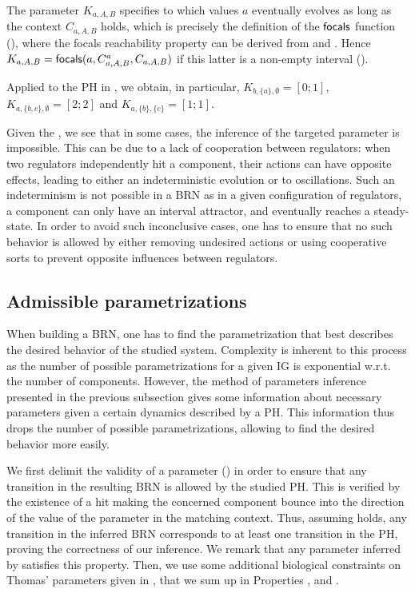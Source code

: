 The parameter $K_{a,A,B}$ specifies to which values $a$ eventually evolves as long as the context
$C_{a,A,B}$ holds, which is precisely the definition of the $\mathsf{focals}$ function (),
where the focals reachability property can be derived from  and
.
Hence $K_{a,A,B} = \mathsf{focals}(a,C^a_{a,A,B},C_{a,A,B})$ if this latter is a non-empty interval
().

\begin{example*}
Applied to the PH in , we obtain, in particular,
$K_{b,\{a\},\emptyset} = [0 ; 1]$,
$K_{a,\{b,c\},\emptyset} = [2 ; 2]$ and
$K_{a,\{b\},\{c\}} = [1;1]$.
\end{example*}

Given the , we see that in some cases, the inference of the targeted parameter is impossible.
This can be due to a lack of cooperation between regulators: when two regulators independently hit a component, their actions can have opposite effects, leading to either an indeterministic evolution or to oscillations.
Such an indeterminism is not possible in a BRN as in a given configuration of regulators, a component can only have an interval attractor, and eventually reaches a steady-state.
In order to avoid such inconclusive cases, one has to ensure that no such behavior is allowed by
either removing undesired actions or using cooperative sorts to prevent opposite influences between
regulators.

\subsection{Admissible parametrizations}\label{ssec:admissible-K}

When building a BRN, one has to find the parametrization that best describes the desired behavior of the studied system.
Complexity is inherent to this process as the number of possible parametrizations for a given IG is exponential w.r.t. the number of components.
However, the method of parameters inference presented in the previous subsection gives some information about necessary parameters given a certain dynamics described by a PH.
This information thus drops the number of possible parametrizations, allowing to find the desired behavior more easily.

We first delimit the validity of a parameter () in order to ensure that any
transition in the resulting BRN is allowed by the studied PH.
This is verified by the existence of a hit making the concerned component bounce into the direction
of the value of the parameter in the matching context.
Thus, assuming  holds, any transition in the inferred BRN corresponds to at least
one transition in the PH, proving the correctness of our inference.
We remark that any parameter inferred by  satisfies this property.
Then, we use some additional biological constraints on Thomas' parameters given in
\cite{BernotSemBRN}, that we sum up in Properties ,
 and .

